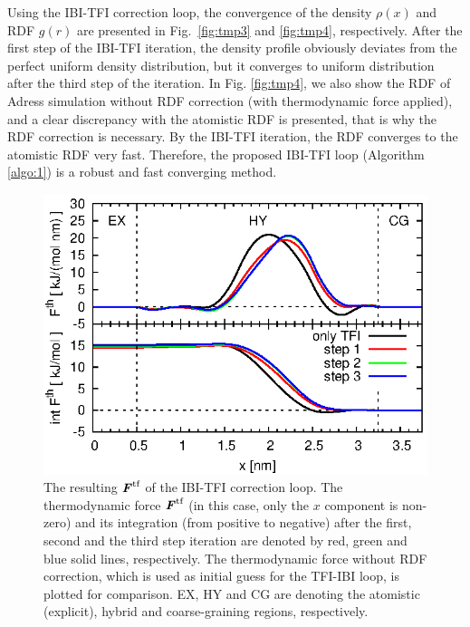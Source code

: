 \documentclass[aps,pre,preprint,unsortedaddress]{revtex4}
\renewcommand{\v}[1]{\textbf{\textit{#1}}}
\begin{document}
Using the IBI-TFI correction loop,
the convergence of the density $\rho(x)$ and RDF $g(r)$ are presented
in Fig.~\ref{fig:tmp3} and \ref{fig:tmp4}, respectively. After the
first step of the IBI-TFI iteration, the density profile obviously
deviates from the perfect uniform density distribution, but it
converges to uniform distribution after the third step of the
iteration. In Fig. \ref{fig:tmp4}, we also show the RDF of Adress
simulation without RDF correction (with thermodynamic force applied),
and a clear discrepancy with the atomistic RDF is presented,
that is why the RDF correction is necessary.  By
the IBI-TFI iteration, the RDF converges to the atomistic RDF very
fast. Therefore, the proposed IBI-TFI loop (Algorithm \ref{algo:1}) is
a robust and fast converging method.

\begin{figure}
  \centering
  \includegraphics{fig/tf-and-int.eps}
  \caption{The resulting $\v F^{\textrm{tf}}$ of the IBI-TFI
    correction loop.  The thermodynamic force $\v F^{\textrm{tf}}$ (in
    this case, only the $x$ component is non-zero) and its integration
    (from positive to negative) after the first, second and the third
    step iteration are denoted by red, green and blue solid lines,
    respectively.  The thermodynamic force without RDF correction,
    which is used as initial guess for the TFI-IBI loop, is plotted
    for comparison. EX, HY and CG are denoting the atomistic
    (explicit), hybrid and coarse-graining regions, respectively.}
  \label{fig:tmp5}
\end{figure}
\end{document}
